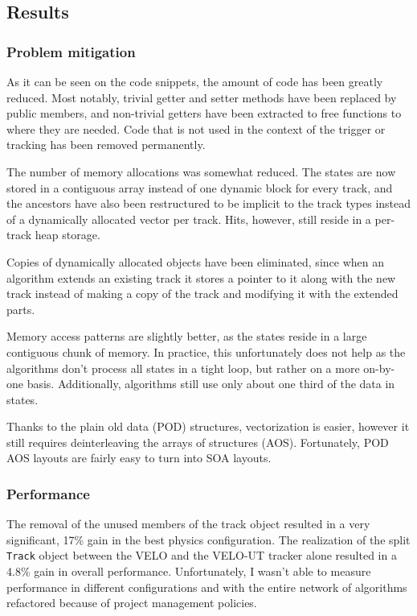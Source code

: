 \documentclass[12pt]{article}
\newcommand{\code}[1]{\texttt{#1}}
\begin{document}
\subsection{Results}

\subsubsection{Problem mitigation}

As it can be seen on the code snippets, the amount of code has been greatly reduced. Most notably, trivial getter and setter methods have been replaced by public members, and non-trivial getters have been extracted to free functions to where they are needed. Code that is not used in the context of the trigger or tracking has been removed permanently.

\vspace{1pc}
The number of memory allocations was somewhat reduced. The states are now stored in a contiguous array instead of one dynamic block for every track, and the ancestors have also been restructured to be implicit to the track types instead of a dynamically allocated vector per track. Hits, however, still reside in a per-track heap storage.

\vspace{1pc}
Copies of dynamically allocated objects have been eliminated, since when an algorithm extends an existing track it stores a pointer to it along with the new track instead of making a copy of the track and modifying it with the extended parts.

\vspace{1pc}
Memory access patterns are slightly better, as the states reside in a large contiguous chunk of memory. In practice, this unfortunately does not help as the algorithms don't process all states in a tight loop, but rather on a more on-by-one basis. Additionally, algorithms still use only about one third of the data in states.

\vspace{1pc}
Thanks to the plain old data (POD) structures, vectorization is easier, however it still requires deinterleaving the arrays of structures (AOS). Fortunately, POD AOS layouts are fairly easy to turn into SOA layouts.


\subsubsection{Performance}

The removal of the unused members of the track object resulted in a very significant, 17\% gain in the best physics configuration. The realization of the split \code{Track} object between the VELO and the VELO-UT tracker alone resulted in a 4.8\% gain in overall performance. Unfortunately, I wasn't able to measure performance in different configurations and with the entire network of algorithms refactored because of project management policies.
\end{document}
